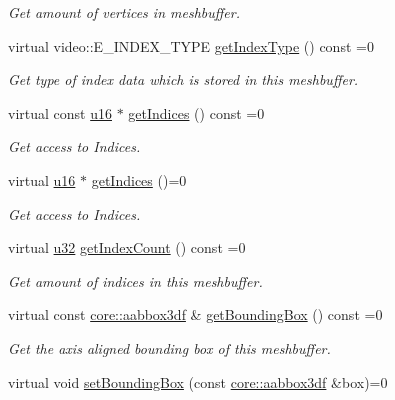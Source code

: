 \begin{DoxyCompactItemize}
\begin{DoxyCompactList}\small\item\em Get amount of vertices in meshbuffer. \end{DoxyCompactList}\item 
virtual video\+::\+E\+\_\+\+I\+N\+D\+E\+X\+\_\+\+T\+Y\+PE \hyperlink{classirr_1_1scene_1_1IMeshBuffer_a8a993431c2c35420b62a577dc18dbdc2}{get\+Index\+Type} () const =0
\begin{DoxyCompactList}\small\item\em Get type of index data which is stored in this meshbuffer. \end{DoxyCompactList}\item 
virtual const \hyperlink{namespaceirr_ae9f8ec82692ad3b83c21f555bfa70bcc}{u16} $\ast$ \hyperlink{classirr_1_1scene_1_1IMeshBuffer_a76c0013378012af7aeb6cb8f4ea8f9a1}{get\+Indices} () const =0
\begin{DoxyCompactList}\small\item\em Get access to Indices. \end{DoxyCompactList}\item 
virtual \hyperlink{namespaceirr_ae9f8ec82692ad3b83c21f555bfa70bcc}{u16} $\ast$ \hyperlink{classirr_1_1scene_1_1IMeshBuffer_a3d33a561023314677361e30cf07ae429}{get\+Indices} ()=0
\begin{DoxyCompactList}\small\item\em Get access to Indices. \end{DoxyCompactList}\item 
virtual \hyperlink{namespaceirr_a0416a53257075833e7002efd0a18e804}{u32} \hyperlink{classirr_1_1scene_1_1IMeshBuffer_a96e08662e15b1205516b87ada3301551}{get\+Index\+Count} () const =0
\begin{DoxyCompactList}\small\item\em Get amount of indices in this meshbuffer. \end{DoxyCompactList}\item 
virtual const \hyperlink{namespaceirr_1_1core_a60f4b4c744aba55f10530d503c6ecb04}{core\+::aabbox3df} \& \hyperlink{classirr_1_1scene_1_1IMeshBuffer_ac53fe1096756a40f25dae25911e27c51}{get\+Bounding\+Box} () const =0
\begin{DoxyCompactList}\small\item\em Get the axis aligned bounding box of this meshbuffer. \end{DoxyCompactList}\item 
virtual void \hyperlink{classirr_1_1scene_1_1IMeshBuffer_adbbfb7757dfbba7357193d2280893df6}{set\+Bounding\+Box} (const \hyperlink{namespaceirr_1_1core_a60f4b4c744aba55f10530d503c6ecb04}{core\+::aabbox3df} \&box)=0

\end{DoxyCompactItemize}
